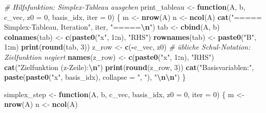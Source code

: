 \documentclass[
]{article}
\newenvironment{Shaded}{\begin{snugshade}}{\end{snugshade}}
\newcommand{\AttributeTok}[1]{\textcolor[rgb]{0.13,0.29,0.53}{#1}}
\newcommand{\CommentTok}[1]{\textcolor[rgb]{0.56,0.35,0.01}{\textit{#1}}}
\newcommand{\ControlFlowTok}[1]{\textcolor[rgb]{0.13,0.29,0.53}{\textbf{#1}}}
\newcommand{\DecValTok}[1]{\textcolor[rgb]{0.00,0.00,0.81}{#1}}
\newcommand{\FunctionTok}[1]{\textcolor[rgb]{0.13,0.29,0.53}{\textbf{#1}}}
\newcommand{\NormalTok}[1]{#1}
\newcommand{\OtherTok}[1]{\textcolor[rgb]{0.56,0.35,0.01}{#1}}
\newcommand{\SpecialCharTok}[1]{\textcolor[rgb]{0.81,0.36,0.00}{\textbf{#1}}}
\newcommand{\StringTok}[1]{\textcolor[rgb]{0.31,0.60,0.02}{#1}}
\begin{document}
\begin{Shaded}
\begin{Highlighting}[]
\CommentTok{\# Hilfsfunktion: Simplex{-}Tableau ausgeben}
\NormalTok{print\_tableau }\OtherTok{\textless{}{-}} \ControlFlowTok{function}\NormalTok{(A, b, c\_vec, }\AttributeTok{z0 =} \DecValTok{0}\NormalTok{, basis\_idx, }\AttributeTok{iter =} \DecValTok{0}\NormalTok{) \{}
\NormalTok{  m }\OtherTok{\textless{}{-}} \FunctionTok{nrow}\NormalTok{(A)}
\NormalTok{  n }\OtherTok{\textless{}{-}} \FunctionTok{ncol}\NormalTok{(A)}
  \FunctionTok{cat}\NormalTok{(}\StringTok{"===== Simplex{-}Tableau, Iteration"}\NormalTok{, iter, }\StringTok{"=====}\SpecialCharTok{\textbackslash{}n}\StringTok{"}\NormalTok{)}
\NormalTok{  tab }\OtherTok{\textless{}{-}} \FunctionTok{cbind}\NormalTok{(A, b)}
  \FunctionTok{colnames}\NormalTok{(tab) }\OtherTok{\textless{}{-}} \FunctionTok{c}\NormalTok{(}\FunctionTok{paste0}\NormalTok{(}\StringTok{"x"}\NormalTok{, }\DecValTok{1}\SpecialCharTok{:}\NormalTok{n), }\StringTok{"RHS"}\NormalTok{)}
  \FunctionTok{rownames}\NormalTok{(tab) }\OtherTok{\textless{}{-}} \FunctionTok{paste0}\NormalTok{(}\StringTok{"B"}\NormalTok{, }\DecValTok{1}\SpecialCharTok{:}\NormalTok{m)}
  \FunctionTok{print}\NormalTok{(}\FunctionTok{round}\NormalTok{(tab, }\DecValTok{3}\NormalTok{))}
\NormalTok{  z\_row }\OtherTok{\textless{}{-}} \FunctionTok{c}\NormalTok{(}\SpecialCharTok{{-}}\NormalTok{c\_vec, z0)  }\CommentTok{\# übliche Schul{-}Notation: Zielfunktion negiert}
  \FunctionTok{names}\NormalTok{(z\_row) }\OtherTok{\textless{}{-}} \FunctionTok{c}\NormalTok{(}\FunctionTok{paste0}\NormalTok{(}\StringTok{"x"}\NormalTok{, }\DecValTok{1}\SpecialCharTok{:}\NormalTok{n), }\StringTok{"RHS"}\NormalTok{)}
  \FunctionTok{cat}\NormalTok{(}\StringTok{"Zielfunktion (z{-}Zeile):}\SpecialCharTok{\textbackslash{}n}\StringTok{"}\NormalTok{)}
  \FunctionTok{print}\NormalTok{(}\FunctionTok{round}\NormalTok{(z\_row, }\DecValTok{3}\NormalTok{))}
  \FunctionTok{cat}\NormalTok{(}\StringTok{"Basisvariablen:"}\NormalTok{, }\FunctionTok{paste}\NormalTok{(}\FunctionTok{paste0}\NormalTok{(}\StringTok{"x"}\NormalTok{, basis\_idx), }\AttributeTok{collapse =} \StringTok{", "}\NormalTok{), }\StringTok{"}\SpecialCharTok{\textbackslash{}n\textbackslash{}n}\StringTok{"}\NormalTok{)}
\NormalTok{\}}


\NormalTok{simplex\_step }\OtherTok{\textless{}{-}} \ControlFlowTok{function}\NormalTok{(A, b, c\_vec, basis\_idx, }\AttributeTok{z0 =} \DecValTok{0}\NormalTok{, }\AttributeTok{iter =} \DecValTok{0}\NormalTok{) \{}
\NormalTok{  m }\OtherTok{\textless{}{-}} \FunctionTok{nrow}\NormalTok{(A)}
\NormalTok{  n }\OtherTok{\textless{}{-}} \FunctionTok{ncol}\NormalTok{(A)}


\end{Highlighting}
\end{Shaded}
\end{document}
